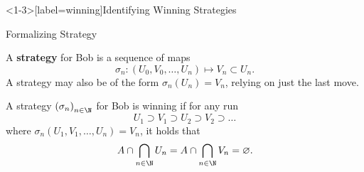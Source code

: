 \documentclass{beamer}
\begin{document}
\begin{frame}<1-3>[label=winning]{Identifying Winning Strategies}


\end{frame}

\begin{frame}{Formalizing Strategy}
    \begin{definition}[Strategy]
        A \textbf{strategy} for Bob is a sequence of maps 
        \[
            \sigma_n : (U_0, V_0, \ldots, U_n) \mapsto V_n \subset U_n
        .\]
        A strategy may also be of the form $\sigma_n(U_n) = V_n$, relying on just the last move.
    \end{definition}

    \begin{definition}
        A strategy $\qty(\sigma_n)_{n \in \N}$ for Bob is winning if for any run
        \[
            U_1 \supset V_1 \supset U_2 \supset V_2 \supset \ldots
        \]
        where $\sigma_n(U_1, V_1, \ldots, U_n) = V_n$, it holds that
        \[
            A \cap \bigcap_{n \in \N} U_n = A \cap \bigcap_{n \in \N} V_n = \varnothing
        .\]
    \end{definition}
\end{frame}


\end{document}
